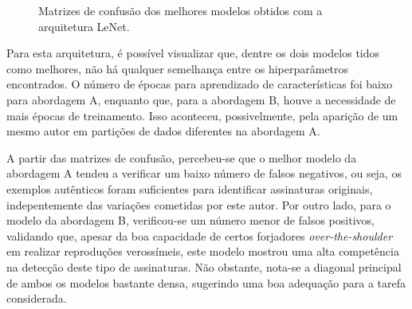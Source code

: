 \begin{figure}[h]
	\centering
	\caption{Matrizes de confusão dos melhores modelos obtidos com a arquitetura LeNet.}\label{fig:matrizes-lenet}
	\hfill
\end{figure}


Para esta arquitetura, é possível visualizar que, dentre os dois modelos tidos como melhores, não há qualquer semelhança entre os hiperparâmetros encontrados. O número de épocas para aprendizado de características foi baixo para abordagem A, enquanto que, para a abordagem B, houve a necessidade de mais épocas de treinamento. Isso aconteceu, possivelmente, pela aparição de um mesmo autor em partições de dados diferentes na abordagem A.

A partir das matrizes de confusão, percebeu-se que o melhor modelo da abordagem A tendeu a verificar um baixo número de falsos negativos, ou seja, os exemplos autênticos foram suficientes para identificar assinaturas originais, indepentemente das variações cometidas por este autor. Por outro lado, para o modelo da abordagem B, verificou-se um número menor de falsos positivos, validando que, apesar da boa capacidade de certos forjadores \emph{over-the-shoulder} em realizar reproduções verossímeis, este modelo mostrou uma alta competência na detecção deste tipo de assinaturas. Não obstante, nota-se a diagonal principal de ambos os modelos bastante densa, sugerindo uma boa adequação para a tarefa considerada.
